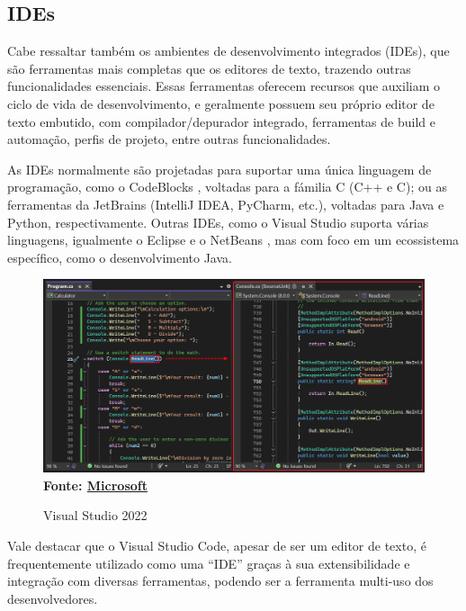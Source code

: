 \subsection{IDEs}

Cabe ressaltar também os ambientes de desenvolvimento integrados (IDEs), que são ferramentas
mais completas que os editores de texto, trazendo outras funcionalidades
essenciais. Essas ferramentas oferecem recursos que auxiliam o ciclo de vida de desenvolvimento,
e geralmente possuem seu próprio editor de texto embutido, com compilador/depurador
integrado, ferramentas de build e automação, perfis de projeto, entre outras
funcionalidades.

As IDEs normalmente são projetadas para suportar uma única linguagem de
programação, como o CodeBlocks \cite{codeblocks}, voltadas para a fámilia C (C++
e C); ou as ferramentas da JetBrains \cite{jetbrains_tools} (IntelliJ IDEA, PyCharm,
etc.), voltadas para Java e Python, respectivamente. Outras IDEs, como o Visual
Studio \cite{visual_studio} suporta várias linguagens, igualmente o Eclipse \cite{eclipse_ide}
e o NetBeans \cite{netbeans_ide}, mas com foco em um ecossistema específico, como
o desenvolvimento Java.

\FloatBarrier
\begin{figure}[!htbp]
    \centering
    \caption{Visual Studio 2022}
    \includegraphics[scale=0.4]{imagens/VisualStudio.png}
    \\\textbf{Fonte: \href{https://learn.microsoft.com/pt-br/visualstudio/ide/go-to-and-peek-definition?view=vs-2022}{Microsoft}} \label{fig:VisualStudio}
\end{figure}
\FloatBarrier

Vale destacar que o Visual Studio Code, apesar de ser um editor de texto, é
frequentemente utilizado como uma ``IDE'' graças à sua extensibilidade e
integração com diversas ferramentas, podendo ser a ferramenta multi-uso dos desenvolvedores.

